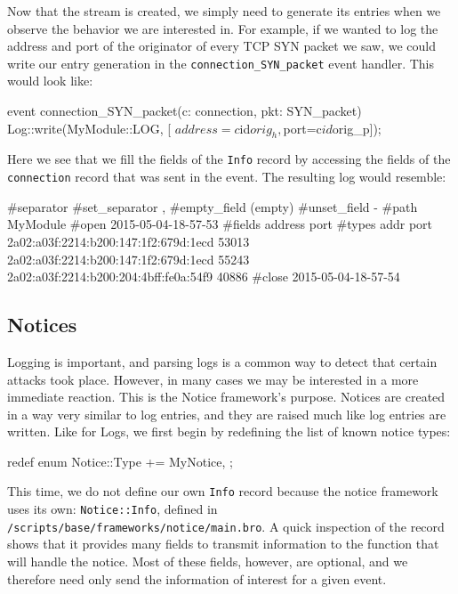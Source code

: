 
Now that the stream is created, we simply need to generate its entries when we observe the behavior we are interested in. For example, if we wanted to log the address and port of the originator of every TCP SYN packet we saw, we could write our entry generation in the \texttt{connection\_SYN\_packet} event handler. This would look like: \\

\begin{code}
event connection_SYN_packet(c: connection, pkt: SYN_packet) {
		Log::write(MyModule::LOG, [	$address=c$id$orig_h,
									$port=c$id$orig_p]);
}
\end{code}

Here we see that we fill the fields of the \texttt{Info} record by accessing the fields of the \texttt{connection} record that was sent in the event. The resulting log would resemble:

\begin{code}
#separator 
#set_separator	,
#empty_field	(empty)
#unset_field	-
#path	MyModule
#open	2015-05-04-18-57-53
#fields	address	port	
#types	addr	port
2a02:a03f:2214:b200:147:1f2:679d:1ecd	53013
2a02:a03f:2214:b200:147:1f2:679d:1ecd	55243
2a02:a03f:2214:b200:204:4bff:fe0a:54f9	40886
#close	2015-05-04-18-57-54
\end{code}


\subsection{Notices}
Logging is important, and parsing logs is a common way to detect that certain attacks took place. However, in many cases we may be interested in a more immediate reaction. This is the Notice framework's purpose. Notices are created in a way very similar to log entries, and they are raised much like log entries are written. Like for Logs, we first begin by redefining the list of known notice types: \\

\begin{code}
	redef enum Notice::Type += { MyNotice, };
\end{code}

This time, we do not define our own \texttt{Info} record because the notice framework uses its own: \texttt{Notice::Info}, defined in \texttt{/scripts/base/frameworks/notice/main.bro}. A quick inspection of the record shows that it provides many fields to transmit information to the function that will handle the notice. Most of these fields, however, are optional, and we therefore need only send the information of interest for a given event.\\

